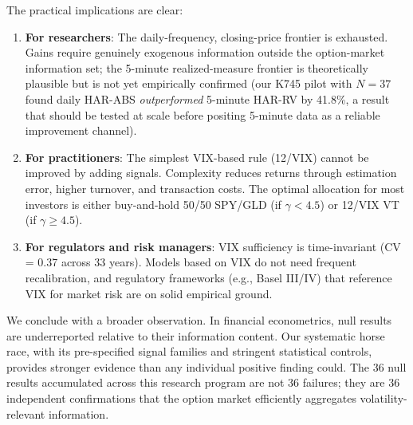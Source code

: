 \documentclass[12pt,a4paper]{article}
\begin{document}
The practical implications are clear:

\begin{enumerate}
    \item \textbf{For researchers}: The daily-frequency, closing-price frontier is exhausted. Gains require genuinely exogenous information outside the option-market information set; the 5-minute realized-measure frontier is theoretically plausible but is not yet empirically confirmed (our K745 pilot with $N = 37$ found daily HAR-ABS \emph{outperformed} 5-minute HAR-RV by 41.8\%, a result that should be tested at scale before positing 5-minute data as a reliable improvement channel).

    \item \textbf{For practitioners}: The simplest VIX-based rule (12/VIX) cannot be improved by adding signals. Complexity reduces returns through estimation error, higher turnover, and transaction costs. The optimal allocation for most investors is either buy-and-hold 50/50 SPY/GLD (if $\gamma < 4.5$) or 12/VIX VT (if $\gamma \geq 4.5$).

    \item \textbf{For regulators and risk managers}: VIX sufficiency is time-invariant (CV = 0.37 across 33 years). Models based on VIX do not need frequent recalibration, and regulatory frameworks (e.g., Basel III/IV) that reference VIX for market risk are on solid empirical ground.
\end{enumerate}

We conclude with a broader observation. In financial econometrics, null results are underreported relative to their information content. Our systematic horse race, with its pre-specified signal families and stringent statistical controls, provides stronger evidence than any individual positive finding could. The 36 null results accumulated across this research program are not 36 failures; they are 36 independent confirmations that the option market efficiently aggregates volatility-relevant information.


\end{document}
